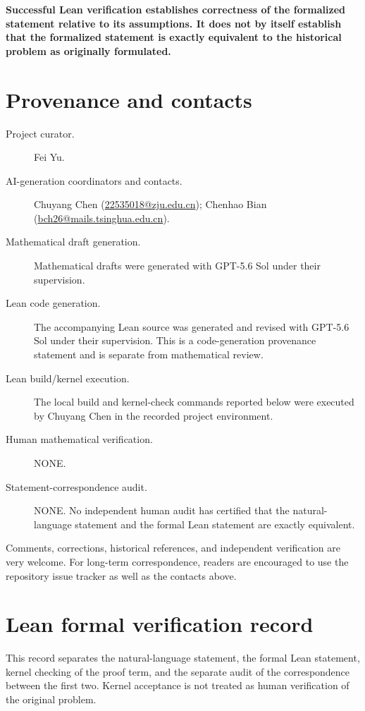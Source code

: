 \documentclass[11pt]{article}
\theoremstyle{definition}
\theoremstyle{remark}
\newcommand{\1}{\mathbf{1}}
\begin{document}
\medskip
\noindent\textbf{Successful Lean verification establishes correctness of the formalized statement relative to its assumptions. It does not by itself establish that the formalized statement is exactly equivalent to the historical problem as originally formulated.}
\endgroup

\section*{Provenance and contacts}
\begingroup\small\sloppy
\begin{description}
\item[Project curator.] Fei Yu.
\item[AI-generation coordinators and contacts.] Chuyang Chen (\href{mailto:22535018@zju.edu.cn}{22535018@zju.edu.cn}); Chenhao Bian (\href{mailto:bch26@mails.tsinghua.edu.cn}{bch26@mails.tsinghua.edu.cn}).
\item[Mathematical draft generation.] Mathematical drafts were generated with GPT-5.6 Sol under their supervision.
\item[Lean code generation.] The accompanying Lean source was generated and revised with GPT-5.6 Sol under their supervision. This is a code-generation provenance statement and is separate from mathematical review.
\item[Lean build/kernel execution.] The local build and kernel-check commands reported below were executed by Chuyang Chen in the recorded project environment.
\item[Human mathematical verification.] NONE.
\item[Statement-correspondence audit.] NONE. No independent human audit has certified that the natural-language statement and the formal Lean statement are exactly equivalent.
\end{description}
\medskip
\noindent Comments, corrections, historical references, and independent verification are very welcome. For long-term correspondence, readers are encouraged to use the repository issue tracker as well as the contacts above.
\endgroup

\section*{Lean formal verification record}

\begingroup\small\sloppy
This record separates the natural-language statement, the formal Lean statement, kernel checking of the proof term, and the separate audit of the correspondence between the first two. Kernel acceptance is not treated as human verification of the original problem.
\end{document}

